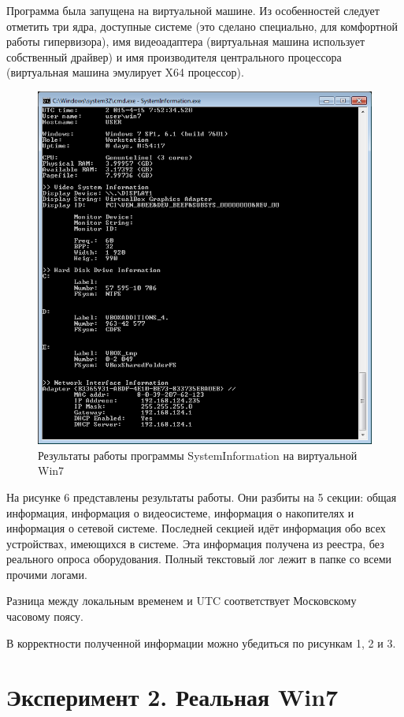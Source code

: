 \documentclass[a4paper, 12pt]{report}		%
\begin{document}
Программа была запущена на виртуальной машине. Из особенностей следует отметить три ядра, доступные системе (это сделано специально, для комфортной работы гипервизора), имя видеоадаптера (виртуальная машина использует собственный драйвер) и имя производителя центрального процессора (виртуальная машина эмулирует X64 процессор).

\begin{figure}[h!]
\centering
\includegraphics[scale=1]{res/result1}
\caption{Результаты работы программы SystemInformation на виртуальной Win7}
\end{figure}

На рисунке 6 представлены результаты работы. Они разбиты на 5 секции: общая информация, информация о видеосистеме, информация о накопителях и информация о сетевой системе. Последней секцией идёт информация обо всех устройствах, имеющихся в системе. Эта информация получена из реестра, без реального опроса оборудования. Полный текстовый лог лежит в папке со всеми прочими логами.


Разница между локальным временем и UTC соответствует Московскому часовому поясу.

В корректности полученной информации можно убедиться по рисункам 1, 2 и 3.


\section*{Эксперимент 2. Реальная Win7}
\end{document}
